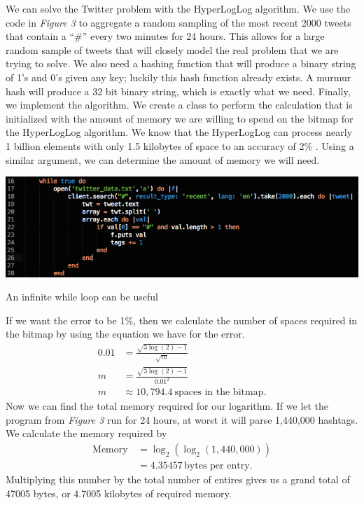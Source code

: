 \documentclass{article}
\begin{document}
\indent We can solve the Twitter problem with the HyperLogLog algorithm.
We use the code in \textit{Figure 3} to aggregate a random sampling of the most recent 2000 tweets that contain a ``\#'' every two minutes for 24 hours.
This allows for a large random sample of tweets that will closely model the real problem that we are trying to solve.
We also need a hashing function that will produce a binary string of 1's and 0's given any key; luckily this hash function already exists.
A murmur hash will produce a 32 bit binary string, which is exactly what we need.
Finally, we implement the algorithm. 
We create a class to perform the calculation that is initialized with the amount of memory we are willing to spend on the bitmap for the HyperLogLog algorithm. 
We know that the HyperLogLog can process nearly 1 billion elements with only 1.5 kilobytes of space to an accuracy of 2\% \cite{Flaj}.
Using a similar argument, we can determine the amount of memory we will need.
\begin{floatingfigure}[hr]{8cm}
\centering
\begin{framed}
\includegraphics[scale=0.3]{Twitter_problem/ruby_code_01}
\caption{An infinite while loop can be useful}
\end{framed}
\end{floatingfigure}
\noindent If we want the error to be 1\%, then we calculate the number of spaces required in the bitmap by using the equation we have for the error.
\begin{align*}
0.01 &= \frac{\sqrt{3\log{(2)} - 1}}{\sqrt{m}}\\
m &= \frac{\sqrt{3\log{(2)} - 1}}{0.01^{2}}\\
m &\approx 10,794.4\ \text{spaces in the bitmap}.
\end{align*}
Now we can find the total memory required for our logarithm. If we let the program from \textit{Figure 3} run for 24 hours, at worst it will parse 1,440,000 hashtags.
We calculate the memory required by
\begin{align*}
\text{Memory}\, &= \log_{2}{(\log_{2}{(1,440,000)})}\\
&= 4.35457 \, \text{bytes per entry}.
\end{align*}
Multiplying this number by the total number of entires gives us a grand total of 47005 bytes, or 4.7005 kilobytes of required memory.\\
\end{document}
